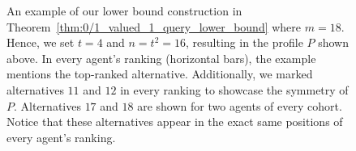\documentclass{article}
\begin{document}
\begin{figure}[ht]
    \caption{An example of our lower bound construction in Theorem~\ref{thm:0/1_valued_1_query_lower_bound} where $m = 18$. Hence, we set $t=4$ and $n=t^2=16$, resulting in the profile $P$ shown above. In every agent's ranking (horizontal bars), the example mentions the top-ranked alternative. Additionally, we marked alternatives $11$ and $12$ in every ranking to showcase the symmetry of $P$. Alternatives $17$ and $18$ are shown for two agents of every cohort. Notice that these alternatives appear in the exact same positions of every agent's ranking.}
    \label{fig:lower_bound_example}
\end{figure}
\end{document}
